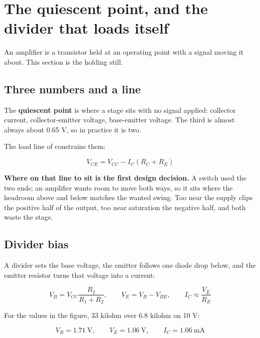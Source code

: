 
\section{The quiescent point, and the divider that loads itself}
\label{c6:app:a}

An amplifier is a transistor held at an operating point with a signal moving it about. This section is the holding still.

\subsection{Three numbers and a line}
\label{c6:sec:a1}
The \textbf{quiescent point} is where a stage sits with no signal applied: collector current, collector-emitter voltage, base-emitter voltage. The third is almost always about 0.65 V, so in practice it is two.

The load line of  constrains them:

\[
  V_{CE} = V_{CC} - I_C(R_C + R_E)
\]

\textbf{Where on that line to sit is the first design decision.} A switch used the two ends; an amplifier wants room to move both ways, so it sits where the headroom above and below matches the wanted swing. Too near the supply clips the positive half of the output, too near saturation the negative half, and both waste the stage.

\subsection{Divider bias}
\label{c6:sec:a2}

A divider sets the base voltage, the emitter follows one diode drop below, and the emitter resistor turns that voltage into a current:

\[
  V_B = V_{CC}\frac{R_2}{R_1 + R_2}, \qquad V_E = V_B - V_{BE}, \qquad I_C \approx \frac{V_E}{R_E}
\]

For the values in the figure, 33 kilohm over 6.8 kilohm on 10 V:

\[
  V_B = 1.71\ \text{V}, \qquad V_E = 1.06\ \text{V}, \qquad I_C = 1.06\ \text{mA}
\]

